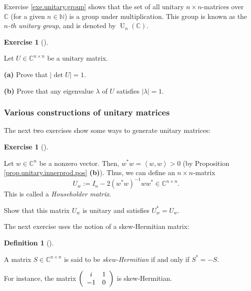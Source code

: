 \documentclass[numbers=enddot,12pt,final,onecolumn,notitlepage]{scrartcl}%
\newcounter{exer}
\numberwithin{exer}{subsection}
\theoremstyle{definition}
\newtheorem{defi}[theo]{Definition}
\newenvironment{definition}[1][]
{\begin{defi}[#1]\begin{leftbar}}
{\end{leftbar}\end{defi}}
\newtheorem{exmp}[exer]{Exercise}
\newenvironment{exercise}[1][]
{\begin{exmp}[#1]\begin{leftbar}}
{\end{leftbar}\end{exmp}}
\begin{document}
Exercise \ref{exe.unitary.group} shows that the set of all unitary $n\times
n$-matrices over $\mathbb{C}$ (for a given $n\in\mathbb{N}$) is a group under
multiplication. This group is known as the $n$\emph{-th unitary group}, and is
denoted by $\operatorname*{U}\nolimits_{n}\left(  \mathbb{C}\right)  $.

\begin{exercise}
\label{exe.unitary.det-eval} Let $U\in\mathbb{C}^{n\times n}$ be a
unitary matrix. \medskip

\textbf{(a)} Prove that $\left\vert \det U\right\vert =1$. \medskip

\textbf{(b)} Prove that any eigenvalue $\lambda$ of $U$ satisfies $\left\vert
\lambda\right\vert =1$.
\end{exercise}

\subsubsection{Various constructions of unitary matrices}

The next two exercises show some ways to generate unitary matrices:

\begin{exercise}
\label{exe.unitary.house} Let $w\in\mathbb{C}^{n}$ be a nonzero
vector. Then, $w^{\ast}w=\left\langle w,w\right\rangle >0$ (by Proposition
\ref{prop.unitary.innerprod.pos} \textbf{(b)}). Thus, we can define an
$n\times n$-matrix
\[
U_{w}:=I_{n}-2\left(  w^{\ast}w\right)  ^{-1}ww^{\ast}\in\mathbb{C}^{n\times
n}.
\]
This is called a \emph{Householder matrix}.

Show that this matrix $U_{w}$ is unitary and satisfies $U_{w}^{\ast}=U_{w}$.
\end{exercise}

The next exercise uses the notion of a skew-Hermitian matrix:

\begin{definition}
\label{def.unitary.skew-herm}A matrix $S\in\mathbb{C}^{n\times n}$ is said to
be \emph{skew-Hermitian} if and only if $S^{\ast}=-S$.
\end{definition}

For instance, the matrix $\left(
\begin{array}
[c]{cc}%
i & 1\\
-1 & 0
\end{array}
\right)  $ is skew-Hermitian.
\end{document}
